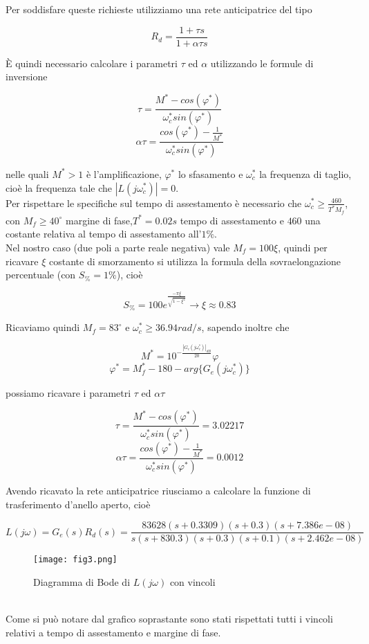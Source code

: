 \documentclass{article}
\begin{document}
Per soddisfare queste richieste utilizziamo una rete anticipatrice del tipo
\begin{large}
\[
R_d=\frac{1+\tau s}{1 + \alpha\tau s}
\]
\end{large}
È quindi necessario calcolare i parametri $\tau$ ed $\alpha$ utilizzando le formule di inversione
\begin{large}
\[
\tau=\frac{M^*-cos(\varphi^*)}{\omega_c^* sin(\varphi^*)}
\]
\[
\alpha\tau=\frac{cos(\varphi^*)-\frac{1}{M^*}}{\omega_c^* sin(\varphi^*)}
\]
\end{large}
nelle quali $M^* > 1$ è l'amplificazione, $\varphi^*$ lo sfasamento e $\omega_c^*$ la frequenza di taglio, cioè la frequenza tale che $|L(j\omega_c^*)|=0$.\\Per rispettare le specifiche sul tempo di assestamento è necessario che $\omega_c^*\geq \frac{460}{T^*M_f}$, con $M_f\geq40^{\circ}$ margine di fase,$T^*=0.02 s$ tempo di assestamento e $460$ una costante relativa al tempo di assestamento all'$1\%$.\\
Nel nostro caso (due poli a parte reale negativa) vale $M_f=100\xi$, quindi per ricavare $\xi$ costante di smorzamento si utilizza la formula della sovraelongazione percentuale (con $S_\%=1\%$), cioè 
\begin{large}
\[
S_\%=100 e^{\frac{-\pi\xi}{\sqrt{1-\xi^2}}} \longrightarrow \xi\approx 0.83
\]
\end{large}
Ricaviamo quindi $M_f=83^{\circ}$ e $\omega_c^*\geq 36.94 rad/s$, sapendo inoltre che
\begin{large}
\[
M^*=10^{-\frac{|G_e(j\omega_c^*)|_{dB}}{20}}
\varphi
\]
\[
\varphi^*=M_f^*-180-arg\{G_e(j\omega_c^*)\}
\]
\end{large}
possiamo ricavare i parametri $\tau$ ed $\alpha\tau$
\begin{large}
\[
\tau=\frac{M^*-cos(\varphi^*)}{\omega_c^* sin(\varphi^*)}=3.02217
\]
\[
\alpha\tau=\frac{cos(\varphi^*)-\frac{1}{M^*}}{\omega_c^* sin(\varphi^*)}=0.0012
\]
\end{large}
Avendo ricavato la rete anticipatrice riusciamo a calcolare la funzione di trasferimento d'anello aperto, cioè
\begin{large}
\[
L(j\omega)=G_e(s)R_d(s)=\frac{83628 (s+0.3309) (s+0.3) (s+7.386e-08)}{s (s+830.3) (s+0.3) (s+0.1) (s+2.462e-08)}
\]
\end{large}
\begin{figure}[!h]
\centering
\texttt{[image: fig3.png]}
\caption{\label{fig:orbit}Diagramma di Bode di $L(j\omega)$ con vincoli}
\end{figure}\\
Come si può notare dal grafico soprastante sono stati rispettati tutti i vincoli relativi a tempo di assestamento e margine di fase.
\end{document}
